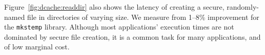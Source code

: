 Figure~\ref{fig:dcache:readdir} also shows 
the latency of creating a secure, randomly-named file in directories of varying size.
We measure from 1--8\% improvement for the {\tt mkstemp} library.
Although most applications' execution times are not dominated by secure file creation,
it is a common task for many applications, and of low marginal cost.

